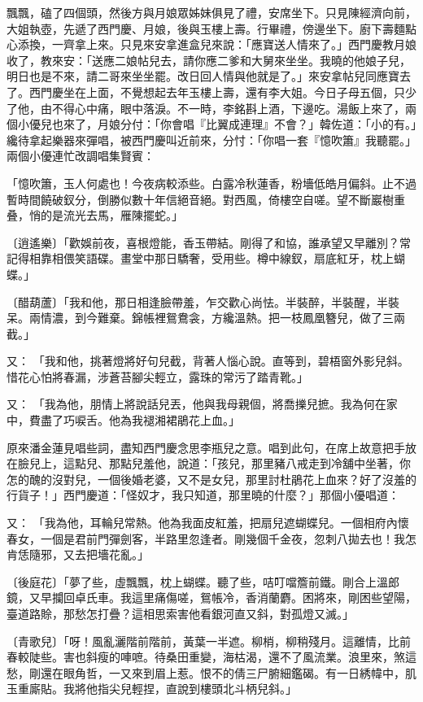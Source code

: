 飄飄，磕了四個頭，然後方與月娘眾姊妹俱見了禮，安席坐下。只見陳經濟向前，大姐執壺，先遞了西門慶、月娘，後與玉樓上壽。行畢禮，傍邊坐下。廚下壽麵點心添換，一齊拿上來。只見來安拿進盒兒來說：「應寶送人情來了。」西門慶教月娘收了，教來安：「送應二娘帖兒去，請你應二爹和大舅來坐坐。我曉的他娘子兒，明日也是不來，請二哥來坐坐罷。改日回人情與他就是了。」來安拿帖兒同應寶去了。西門慶坐在上面，不覺想起去年玉樓上壽，還有李大姐。今日子母五個，只少了他，由不得心中痛，眼中落淚。不一時，李銘斟上酒，下邊吃。湯飯上來了，兩個小優兒也來了，月娘分付：「你會唱『比翼成連理』不會？」韓佐道：「小的有。」纔待拿起樂器來彈唱，被西門慶叫近前來，分忖：「你唱一套『憶吹簫』我聽罷。」兩個小優連忙改調唱集賢賓：

「憶吹簫，玉人何處也！今夜病較添些。白露冷秋蓮香，粉墻低皓月偏斜。止不過暫時間饒破釵分，倒勝似數十年信絕音絕。對西風，倚樓空自嗟。望不斷巖樹重叠，悄的是流光去馬，雁陳擺蛇。」

〔逍遙樂〕「歡娛前夜，喜根燈能，香玉帶結。剛得了和協，誰承望又早離別？常記得相靠相偎笑語碟。畫堂中那日驕奢，受用些。樽中線釵，扇底紅牙，枕上蝴蝶。」

〔醋葫蘆〕「我和他，那日相逢臉帶羞，乍交歡心尚怯。半裝醉，半裝醒，半裝呆。兩情濃，到今難棄。錦帳裡鴛鴦衾，方纔溫熱。把一枝鳳凰簪兒，做了三兩截。」

又：  「我和他，挑著燈將好句兒截，背著人惱心說。直等到，碧梧窗外影兒斜。惜花心怕將春漏，涉蒼苔腳尖輕立，露珠的常污了踏青靴。」

又：  「我為他，朋情上將說話兒丟，他與我母親個，將喬擽兒摭。我為何在家中，費盡了巧唳舌。他為我褪湘裙鵑花上血。」

原來潘金蓮見唱些詞，盡知西門慶念思李瓶兒之意。唱到此句，在席上故意把手放在臉兒上，這點兒、那點兒羞他，說道：「孩兒，那里豬八戒走到冷舖中坐著，你怎的醜的沒對兒，一個後婚老婆，又不是女兒，那里討杜鵑花上血來？好了沒羞的行貨子！」西門慶道：「怪奴才，我只知道，那里曉的什麼？」那個小優唱道：

又：  「我為他，耳輪兒常熱。他為我面皮紅羞，把扇兒遮蝴蝶兒。一個相府內懷春女，一個是君前門彈劍客，半路里忽逢者。剛幾個千金夜，忽刺八拋去也！我怎肯恁隨邪，又去把墻花亂。」

〔後庭花〕「夢了些，虛飄飄，枕上蝴蝶。聽了些，咭叮噹簷前鐵。剛合上溫郎鏡，又早攔回卓氏車。我這里痛傷嗟，鴛帳冷，香消蘭麝。困將來，剛困些望陽，臺道路賒，那愁怎打疊？這相思索害他看銀河直又斜，對孤燈又滅。」

〔青歌兒〕「呀！風亂灑階前階前，黃葉一半遮。柳梢，柳稍殘月。這離情，比前春較陡些。害也斜瘦的唓嗻。待桑田重變，海枯渴，還不了風流業。浪里來，煞這愁，剛還在眼角哲，一又來到眉上惹。恨不的倩三尸腑細鑑碣。有一日綉幃中，肌玉重廝貼。我將他指尖兒輕捏，直說到樓頭北斗柄兒斜。」

